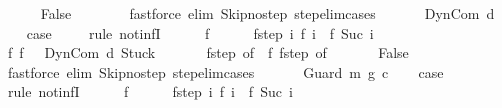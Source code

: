 \begin{isabellebody}
\ \ \ \ \isamarkupfalse%
\ False\isanewline
\ \ \ \ \ \ \isamarkupfalse%
\ {\isacharparenleft}fastforce\ elim{\isacharcolon}\ Skip{\isacharunderscore}no{\isacharunderscore}step\ step{\isacharunderscore}elim{\isacharunderscore}cases{\isacharparenright}\isanewline
\ \ \isamarkupfalse%
\isanewline
{}\isamarkupfalse%
\isanewline
\ \ \isamarkupfalse%
\ {\isacharparenleft}DynCom\ d{\isacharparenright}\ \isanewline
\ \ \isamarkupfalse%
\ {\isacharquery}case\ \isanewline
\ \ \isamarkupfalse%
\ {\isacharparenleft}rule\ not{\isacharunderscore}infI{\isacharparenright}\isanewline
\ \ \ \ \isamarkupfalse%
\ f\isanewline
\ \ \ \ \isamarkupfalse%
\ f{\isacharunderscore}step{\isacharcolon}\ {\isachardoublequoteopen}{\isasymAnd}i{\isachardot}\ {\isasymGamma}{\isasymturnstile}f\ i\ {\isasymrightarrow}\ f\ {\isacharparenleft}Suc\ i{\isacharparenright}{\isachardoublequoteclose}\isanewline
\ \ \ \ \isamarkupfalse%
\ f{\isacharunderscore}{}{\isacharcolon}\ {\isachardoublequoteopen}f\ {}\ {\isacharequal}\ {\isacharparenleft}DynCom\ d{\isacharcomma}\ Stuck{\isacharparenright}{\isachardoublequoteclose}\ \isanewline
\ \ \ \ \isamarkupfalse%
\ f{\isacharunderscore}step\ {\isacharbrackleft}of\ {}{\isacharbrackright}\ f{\isacharunderscore}{}\ f{\isacharunderscore}step\ {\isacharbrackleft}of\ {}{\isacharbrackright}\isanewline
\ \ \ \ \isamarkupfalse%
\ False\isanewline
\ \ \ \ \ \ \isamarkupfalse%
\ {\isacharparenleft}fastforce\ elim{\isacharcolon}\ Skip{\isacharunderscore}no{\isacharunderscore}step\ step{\isacharunderscore}elim{\isacharunderscore}cases{\isacharparenright}\isanewline
\ \ \isamarkupfalse%
\isanewline
{}\isamarkupfalse%
\isanewline
\ \ \isamarkupfalse%
\ {\isacharparenleft}Guard\ m\ g\ c{\isacharparenright}\isanewline
\ \ \isamarkupfalse%
\ {\isacharquery}case\ \isanewline
\ \ \isamarkupfalse%
\ {\isacharparenleft}rule\ not{\isacharunderscore}infI{\isacharparenright}\isanewline
\ \ \ \ \isamarkupfalse%
\ f\isanewline
\ \ \ \ \isamarkupfalse%
\ f{\isacharunderscore}step{\isacharcolon}\ {\isachardoublequoteopen}{\isasymAnd}i{\isachardot}\ {\isasymGamma}{\isasymturnstile}f\ i\ {\isasymrightarrow}\ f\ {\isacharparenleft}Suc\ i{\isacharparenright}{\isachardoublequoteclose}\isanewline
\ \ \ \ \isamarkupfalse%

\end{isabellebody}
